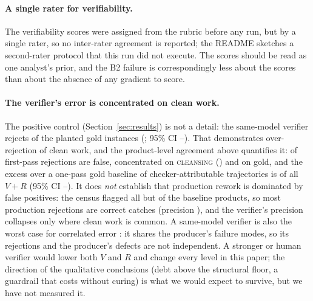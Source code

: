 \documentclass[11pt]{article}
\newcommand{\VV}{\ensuremath{V}}
\newcommand{\RV}{\ensuremath{R}}
\newcommand{\famname}[1]{\textsc{#1}}
\begin{document}
\paragraph{A single rater for verifiability.} The verifiability scores were assigned from the
rubric before any run, but by a single rater, so no inter-rater agreement is reported; the README
sketches a second-rater protocol that this run did not execute. The scores should be read as one
analyst's prior, and the B2 failure is correspondingly less about the scores than about the absence
of any gradient to score.

\paragraph{The verifier's error is concentrated on clean work.} The positive control
(Section~\ref{sec:results}) is not a detail: the same-model verifier rejects \VDgoldRej{} of the
planted gold instances (\VDgoldRejRate{}; 95\% CI \VDgoldRejLo--\VDgoldRejHi). That demonstrates
over-rejection of clean work, and the product-level agreement above quantifies it: \VDdetFalseRej{}
of first-pass rejections are false, concentrated on \famname{cleansing} (\VDdetCleanseFalseRej{})
and on gold, and the excess over a one-pass gold baseline of checker-attributable trajectories is
\VDchkShare{} of all $\VV+\RV$ (95\% CI \VDchkShareLo--\VDchkShareHi). It does \emph{not}
establish that production rework is dominated by false positives: the census flagged all but
\VDfirstPass{} of the baseline products, so most production rejections are correct catches
(precision \VDdetPrec{}), and the verifier's precision collapses only where clean work is common. A
same-model verifier is also the worst case
for correlated error \citep{huang2023}: it shares the producer's failure modes, so its rejections
and the producer's defects are not independent. A stronger or human verifier would lower
both $\VV$ and $\RV$ and change every level in this paper; the direction of the qualitative
conclusions (debt above the structural floor, a guardrail that costs without curing) is what we
would expect to survive, but we have not measured it.
\end{document}
